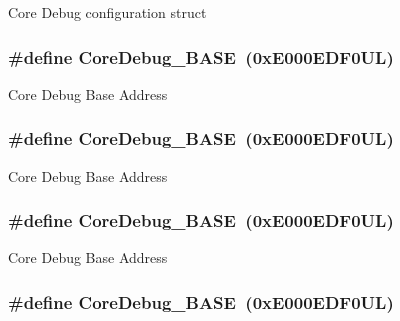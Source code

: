 Core Debug configuration struct \hypertarget{group___c_m_s_i_s__core__base_ga680604dbcda9e9b31a1639fcffe5230b}{
\subsubsection[{Core\-Debug\-\_\-\-B\-A\-S\-E}]{\setlength{\rightskip}{0pt plus 5cm}\#define Core\-Debug\-\_\-\-B\-A\-S\-E~(0x\-E000\-E\-D\-F0\-U\-L)}}\label{group___c_m_s_i_s__core__base_ga680604dbcda9e9b31a1639fcffe5230b}
Core Debug Base Address \hypertarget{group___c_m_s_i_s__core__base_ga680604dbcda9e9b31a1639fcffe5230b}{
\subsubsection[{Core\-Debug\-\_\-\-B\-A\-S\-E}]{\setlength{\rightskip}{0pt plus 5cm}\#define Core\-Debug\-\_\-\-B\-A\-S\-E~(0x\-E000\-E\-D\-F0\-U\-L)}}\label{group___c_m_s_i_s__core__base_ga680604dbcda9e9b31a1639fcffe5230b}
Core Debug Base Address \hypertarget{group___c_m_s_i_s__core__base_ga680604dbcda9e9b31a1639fcffe5230b}{
\subsubsection[{Core\-Debug\-\_\-\-B\-A\-S\-E}]{\setlength{\rightskip}{0pt plus 5cm}\#define Core\-Debug\-\_\-\-B\-A\-S\-E~(0x\-E000\-E\-D\-F0\-U\-L)}}\label{group___c_m_s_i_s__core__base_ga680604dbcda9e9b31a1639fcffe5230b}
Core Debug Base Address \hypertarget{group___c_m_s_i_s__core__base_ga680604dbcda9e9b31a1639fcffe5230b}{
\subsubsection[{Core\-Debug\-\_\-\-B\-A\-S\-E}]{\setlength{\rightskip}{0pt plus 5cm}\#define Core\-Debug\-\_\-\-B\-A\-S\-E~(0x\-E000\-E\-D\-F0\-U\-L)}}\label{group___c_m_s_i_s__core__base_ga680604dbcda9e9b31a1639fcffe5230b}
